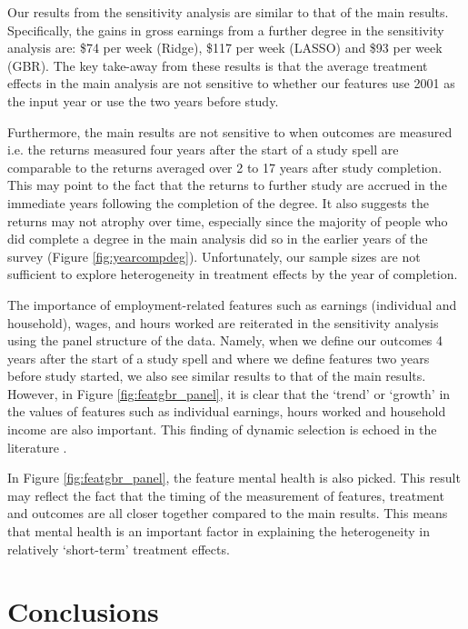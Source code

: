 \documentclass[12pt, a4paper]{article}
\begin{document}
Our results from the sensitivity analysis are similar to that of the main
results. Specifically, the gains in gross earnings from a further degree in the
sensitivity analysis are: \$74 per week (Ridge), \$117 per week (LASSO) and
\$93 per week (GBR). The key take-away from these results is that the average
treatment effects in the main analysis are not sensitive to whether our
features use 2001 as the input year or use the two years before study. 

Furthermore, the main results are not sensitive to when outcomes are measured
i.e. the returns measured four years after the start of a study spell are
comparable to the returns averaged over 2 to 17 years after study completion.
This may point to the fact that the returns to further study are accrued in the
immediate years following the completion of the degree. It also suggests the
returns may not atrophy over time, especially since the majority of people who
did complete a degree in the main analysis did so in the earlier years of the
survey (Figure \ref{fig:yearcompdeg}). Unfortunately, our sample sizes are not
sufficient to explore heterogeneity in treatment effects by the year of
completion. 

The importance of employment-related features such as earnings (individual and
household), wages, and hours worked are reiterated in the sensitivity analysis
using the panel structure of the data. Namely, when we define our outcomes 4
years after the start of a study spell and where we define features two years
before study started, we also see similar results to that of the main results.
However, in Figure \ref{fig:featgbr_panel}, it is clear that the `trend' or
`growth' in the values of features such as individual earnings, hours worked
and household income are also important. This finding of dynamic selection is
echoed in the literature \citep{jacobson2005, dynarski2016, dynarski2018}. 

In Figure \ref{fig:featgbr_panel}, the feature mental health is also picked.
This result may reflect the fact that the timing of the measurement of
features, treatment and outcomes are all closer together compared to the main
results. This means that mental health is an important factor in explaining the
heterogeneity in relatively `short-term' treatment effects. 


\section{Conclusions}
\end{document}
